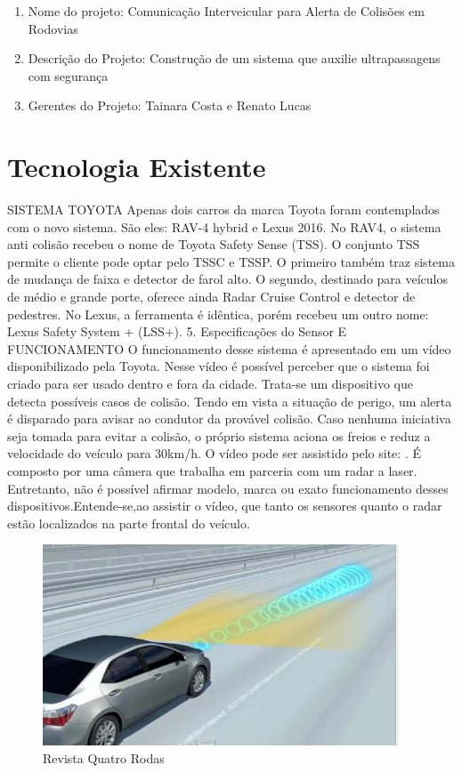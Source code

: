 \begin{enumerate}
	\item Nome do projeto: Comunicação Interveicular para Alerta de Colisões em Rodovias
	\item Descrição do Projeto: Construção de um sistema que auxilie ultrapassagens com segurança
	\item Gerentes do Projeto: Tainara Costa e Renato Lucas
\end{enumerate}

\section{Tecnologia Existente}

SISTEMA TOYOTA Apenas dois carros da marca Toyota foram contemplados com o novo
sistema. São eles: RAV-4 hybrid e Lexus 2016. \cite{3comper} No RAV4, o sistema
anti colisão recebeu o nome de Toyota Safety Sense (TSS). O conjunto TSS permite
o cliente pode optar pelo TSSC e TSSP. O primeiro também traz sistema de mudança
de faixa e detector de farol alto. O segundo, destinado para veículos de médio
e grande porte, oferece ainda Radar Cruise Control e detector de pedestres. No
Lexus, a ferramenta é idêntica, porém recebeu um outro nome: Lexus Safety System
 + (LSS+). 5. Especificações do Sensor E FUNCIONAMENTO O funcionamento desse
sistema é apresentado em um vídeo disponibilizado pela Toyota. Nesse vídeo é
 possível perceber que o sistema foi criado para ser usado dentro e fora da cidade.
Trata-se um dispositivo que detecta possíveis casos de colisão. Tendo em vista a
situação de perigo, um alerta é disparado para avisar ao condutor da provável
colisão. Caso nenhuma iniciativa seja tomada para evitar a colisão, o próprio
sistema aciona os freios e reduz a velocidade do veículo para 30km/h. O vídeo
pode ser assistido pelo site: \cite{4comper}. É composto por uma câmera que
trabalha em parceria com um radar a laser. Entretanto, não é possível afirmar
modelo, marca ou exato funcionamento desses dispositivos.Entende-se,ao assistir
o vídeo, que tanto os sensores quanto o radar estão localizados na parte frontal
do veículo.

\begin{figure}[h]
  \centering
  \includegraphics[width=400px, scale=1]{figuras/sinal_componentes}
  \caption{Revista Quatro Rodas}
\label{fig:sinal_componentes}
\end{figure}


